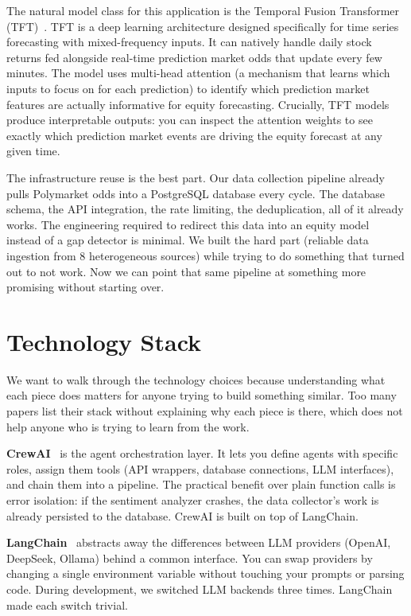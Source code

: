 \documentclass[conference]{IEEEtran}
\begin{document}
The natural model class for this application is the Temporal Fusion Transformer (TFT)~\cite{lim2021}. TFT is a deep learning architecture designed specifically for time series forecasting with mixed-frequency inputs. It can natively handle daily stock returns fed alongside real-time prediction market odds that update every few minutes. The model uses multi-head attention (a mechanism that learns which inputs to focus on for each prediction) to identify which prediction market features are actually informative for equity forecasting. Crucially, TFT models produce interpretable outputs: you can inspect the attention weights to see exactly which prediction market events are driving the equity forecast at any given time.

The infrastructure reuse is the best part. Our data collection pipeline already pulls Polymarket odds into a PostgreSQL database every cycle. The database schema, the API integration, the rate limiting, the deduplication, all of it already works. The engineering required to redirect this data into an equity model instead of a gap detector is minimal. We built the hard part (reliable data ingestion from 8 heterogeneous sources) while trying to do something that turned out to not work. Now we can point that same pipeline at something more promising without starting over.

\section{Technology Stack}

We want to walk through the technology choices because understanding what each piece does matters for anyone trying to build something similar. Too many papers list their stack without explaining why each piece is there, which does not help anyone who is trying to learn from the work.

\textbf{CrewAI}~\cite{crewai2024} is the agent orchestration layer. It lets you define agents with specific roles, assign them tools (API wrappers, database connections, LLM interfaces), and chain them into a pipeline. The practical benefit over plain function calls is error isolation: if the sentiment analyzer crashes, the data collector's work is already persisted to the database. CrewAI is built on top of LangChain.

\textbf{LangChain}~\cite{langchain2023} abstracts away the differences between LLM providers (OpenAI, DeepSeek, Ollama) behind a common interface. You can swap providers by changing a single environment variable without touching your prompts or parsing code. During development, we switched LLM backends three times. LangChain made each switch trivial.
\end{document}

